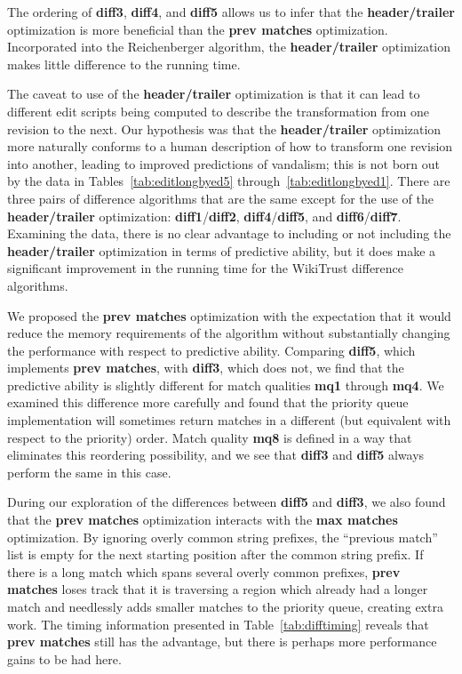 \vspace{1pc}

The ordering of \textbf{diff3}, \textbf{diff4}, and \textbf{diff5}
allows us to infer that the \textbf{header/trailer} optimization
is more beneficial than the \textbf{prev matches} optimization.
Incorporated into the Reichenberger algorithm, the
\textbf{header/trailer} optimization makes little difference
to the running time.

The caveat to use of the \textbf{header/trailer} optimization
is that it can lead to different edit scripts being computed
to describe the transformation from one revision to the next.
Our hypothesis was that the \textbf{header/trailer} optimization
more naturally conforms to a human description of how to transform
one revision into another, leading to improved predictions of
vandalism; this is not born out by the data in
Tables~\ref{tab:editlongbyed5} through~\ref{tab:editlongbyed1}.
There are three pairs of difference algorithms that are the same
except for the use of the \textbf{header/trailer} optimization:
\textbf{diff1}/\textbf{diff2}, \textbf{diff4}/\textbf{diff5},
and \textbf{diff6}/\textbf{diff7}.
Examining the data, there is no clear advantage to including or
not including the \textbf{header/trailer} optimization in terms of
predictive ability, but it does make a significant improvement in
the running time for the WikiTrust difference algorithms.

\vspace{1pc}

We proposed the \textbf{prev matches} optimization with the expectation
that it would reduce the memory requirements of the algorithm without
substantially changing the performance with respect to predictive
ability.
Comparing \textbf{diff5}, which implements \textbf{prev matches},
with \textbf{diff3}, which does not, we find that the predictive ability
is slightly different for match qualities \textbf{mq1} through
\textbf{mq4}.
We examined this difference more carefully and found that the priority
queue implementation will sometimes return matches in a different
(but equivalent with respect to the priority) order.
Match quality \textbf{mq8} is defined in a way that eliminates this
reordering possibility, and we see that \textbf{diff3} and
\textbf{diff5} always perform the same in this case.

During our exploration of the differences between \textbf{diff5}
and \textbf{diff3}, we also found that the \textbf{prev matches}
optimization interacts with the \textbf{max matches} optimization.
By ignoring overly common string prefixes, the ``previous match'' list
is empty for the next starting position after the common string prefix.
If there is a long match which spans several overly common prefixes,
\textbf{prev matches} loses track that it is traversing a region which
already had a longer match and needlessly adds smaller matches to the
priority queue, creating extra work.
The timing information presented in Table~\ref{tab:difftiming} reveals
that \textbf{prev matches} still has the advantage, but there is perhaps
more performance gains to be had here.


